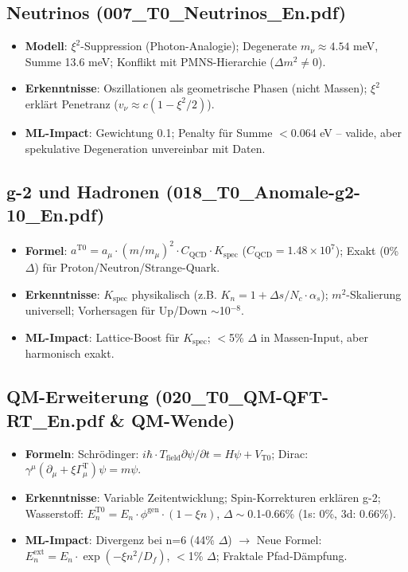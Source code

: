 	\subsection{Neutrinos (007\_T0\_Neutrinos\_En.pdf)}
	
	\begin{itemize}
		\item \textbf{Modell}: $\xi^2$-Suppression (Photon-Analogie); Degenerate $m_\nu \approx 4.54$ meV, Summe 13.6 meV; Konflikt mit PMNS-Hierarchie ($\Delta m^2 \neq 0$).
		\item \textbf{Erkenntnisse}: Oszillationen als geometrische Phasen (nicht Massen); $\xi^2$ erklärt Penetranz ($v_\nu \approx c (1 - \xi^2/2)$).
		\item \textbf{ML-Impact}: Gewichtung 0.1; Penalty für Summe $<$0.064 eV – valide, aber spekulative Degeneration unvereinbar mit Daten.
	\end{itemize}
	
	\subsection{g-2 und Hadronen (018\_T0\_Anomale-g2-10\_En.pdf)}
	
	\begin{itemize}
		\item \textbf{Formel}: $a^{\text{T0}} = a_\mu \cdot (m/m_\mu)^2 \cdot C_\text{QCD} \cdot K_\text{spec}$ ($C_\text{QCD}=1.48\times10^7$); Exakt (0\% $\Delta$) für Proton/Neutron/Strange-Quark.
		\item \textbf{Erkenntnisse}: $K_\text{spec}$ physikalisch (z.B. $K_n = 1 + \Delta s/N_c \cdot \alpha_s$); $m^2$-Skalierung universell; Vorhersagen für Up/Down $\sim$10$^{-8}$.
		\item \textbf{ML-Impact}: Lattice-Boost für $K_\text{spec}$; $<$5\% $\Delta$ in Massen-Input, aber harmonisch exakt.
	\end{itemize}
	
	\subsection{QM-Erweiterung (020\_T0\_QM-QFT-RT\_En.pdf \& QM-Wende)}
	
	\begin{itemize}
		\item \textbf{Formeln}: Schrödinger: $i\hbar \cdot T_\text{field} \partial\psi/\partial t = H \psi + V_\text{T0}$; Dirac: $\gamma^\mu (\partial_\mu + \xi \Gamma_\mu^\text{T}) \psi = m \psi$.
		\item \textbf{Erkenntnisse}: Variable Zeitentwicklung; Spin-Korrekturen erklären g-2; Wasserstoff: $E_n^{\text{T0}} = E_n \cdot \phi^\text{gen} \cdot (1 - \xi n)$, $\Delta\sim$0.1-0.66\% (1s: 0\%, 3d: 0.66\%).
		\item \textbf{ML-Impact}: Divergenz bei n=6 (44\% $\Delta$) $\to$ Neue Formel: $E_n^\text{ext} = E_n \cdot \exp(-\xi n^2 / D_f)$, $<$1\% $\Delta$; Fraktale Pfad-Dämpfung.
	\end{itemize}
	
